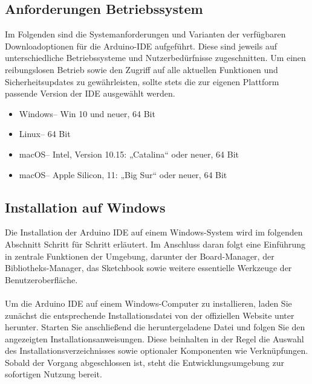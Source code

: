 \subsection{Anforderungen Betriebssystem} 

Im Folgenden sind die Systemanforderungen und Varianten der verfügbaren Downloadoptionen für die Arduino-IDE aufgeführt. Diese sind jeweils auf unterschiedliche Betriebssysteme und Nutzerbedürfnisse zugeschnitten. Um einen reibungslosen Betrieb sowie den Zugriff auf alle aktuellen Funktionen und Sicherheitsupdates zu gewährleisten, sollte stets die zur eigenen Plattform passende Version der IDE ausgewählt werden. 

\begin{itemize} 
	
	
	\item Windows– Win 10 und neuer, 64 Bit\\ 
	
	\item Linux– 64 Bit\\ 
	
	\item macOS– Intel, Version 10.15: „Catalina“ oder neuer, 64 Bit\\ 
	
	\item macOS– Apple Silicon, 11: „Big Sur“ oder neuer, 64 Bit\\ 
	
	
\end{itemize} 



\subsection{Installation auf Windows} 

Die Installation der Arduino IDE auf einem Windows-System wird im folgenden Abschnitt Schritt für Schritt erläutert. Im Anschluss daran folgt eine Einführung in zentrale Funktionen der Umgebung, darunter der Board-Manager, der Bibliotheks-Manager, das Sketchbook sowie weitere essentielle Werkzeuge der Benutzeroberfläche. 
\\\\ 
Um die Arduino IDE auf einem Windows-Computer zu installieren, laden Sie zunächst die entsprechende Installationsdatei von der offiziellen Website unter  herunter. Starten Sie anschließend die heruntergeladene Datei und folgen Sie den angezeigten Installationsanweisungen. Diese beinhalten in der Regel die Auswahl des Installationsverzeichnisses sowie optionaler Komponenten wie Verknüpfungen. Sobald der Vorgang abgeschlossen ist, steht die Entwicklungsumgebung zur sofortigen Nutzung bereit. 

